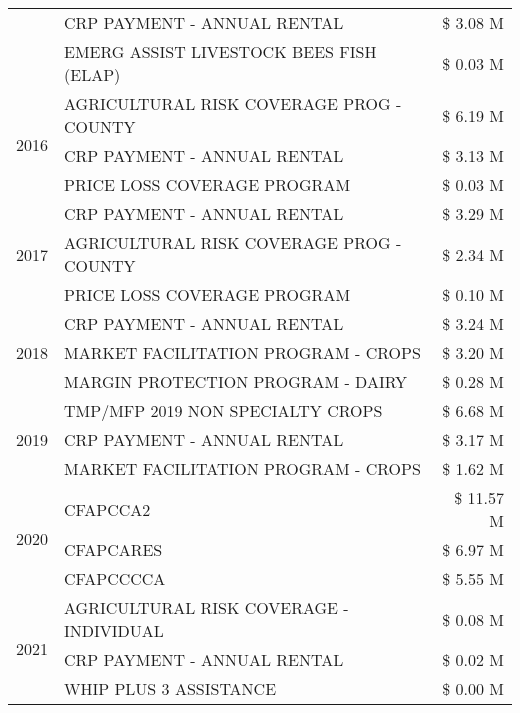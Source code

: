 \begin{tabular}{llr}
 & CRP PAYMENT - ANNUAL RENTAL & \$ 3.08 M \\
 & EMERG ASSIST LIVESTOCK BEES FISH (ELAP) & \$ 0.03 M \\
\cline{1-3}
\multirow[t]{3}{*}{2016} & AGRICULTURAL RISK COVERAGE PROG - COUNTY & \$ 6.19 M \\
 & CRP PAYMENT - ANNUAL RENTAL & \$ 3.13 M \\
 & PRICE LOSS COVERAGE PROGRAM & \$ 0.03 M \\
\cline{1-3}
\multirow[t]{3}{*}{2017} & CRP PAYMENT - ANNUAL RENTAL & \$ 3.29 M \\
 & AGRICULTURAL RISK COVERAGE PROG - COUNTY & \$ 2.34 M \\
 & PRICE LOSS COVERAGE PROGRAM & \$ 0.10 M \\
\cline{1-3}
\multirow[t]{3}{*}{2018} & CRP PAYMENT - ANNUAL RENTAL & \$ 3.24 M \\
 & MARKET FACILITATION PROGRAM - CROPS & \$ 3.20 M \\
 & MARGIN PROTECTION PROGRAM - DAIRY & \$ 0.28 M \\
\cline{1-3}
\multirow[t]{3}{*}{2019} & TMP/MFP 2019 NON SPECIALTY CROPS & \$ 6.68 M \\
 & CRP PAYMENT - ANNUAL RENTAL & \$ 3.17 M \\
 & MARKET FACILITATION PROGRAM - CROPS & \$ 1.62 M \\
\cline{1-3}
\multirow[t]{3}{*}{2020} & CFAPCCA2 & \$ 11.57 M \\
 & CFAPCARES & \$ 6.97 M \\
 & CFAPCCCCA & \$ 5.55 M \\
\cline{1-3}
\multirow[t]{3}{*}{2021} & AGRICULTURAL RISK COVERAGE - INDIVIDUAL & \$ 0.08 M \\
 & CRP PAYMENT - ANNUAL RENTAL & \$ 0.02 M \\
 & WHIP PLUS 3 ASSISTANCE & \$ 0.00 M \\
\cline{1-3}
\bottomrule
\end{tabular}
